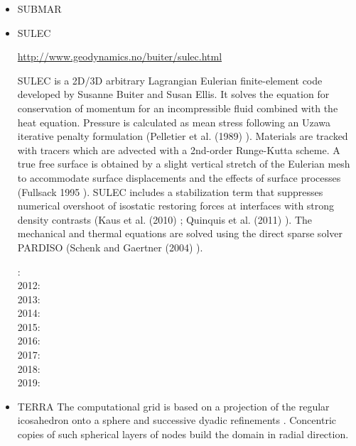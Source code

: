 \begin{itemize}
\item {\codefont SUBMAR} 

{\small
\noindent
\cite{masr06}
\cite{masp07}
\cite{roms10}
}

\item {\codefont SULEC} 

\url{http://www.geodynamics.no/buiter/sulec.html}

SULEC is a 2D/3D arbitrary Lagrangian Eulerian finite-element code developed by Susanne Buiter and Susan Ellis. 
It solves the equation for conservation of momentum for an incompressible fluid combined with 
the heat equation. Pressure is calculated as mean stress following an Uzawa iterative penalty 
formulation (Pelletier et al. (1989) \cite{pefc89}). 
Materials are tracked with tracers which are advected with a 2nd-order Runge-Kutta scheme. 
A true free surface is obtained by a slight vertical stretch of the Eulerian mesh to 
accommodate surface displacements and the effects of surface processes (Fullsack 1995 \cite{full95}). 
SULEC includes a stabilization term that suppresses numerical overshoot of isostatic restoring forces 
at interfaces with strong density contrasts (Kaus et al. (2010) \cite{kamm10}; 
Quinquis et al. (2011) \cite{qube11}). The mechanical and thermal equations are solved using 
the direct sparse solver PARDISO (Schenk and Gaertner (2004) \cite{scga04}).

{\small
{}: \cite{qube11}\cite{ellw11}\\
2012: \cite{buit12}\cite{tebu12}\cite{crsg12}\cite{grel12}\\
2013: \cite{ghbu13}\\
2014: \cite{ghbu14}\cite{qubu14}\\
2015: \cite{nabu15}\\
2016: \cite{zwsn16}\\
2017: \cite{nabp17}\\
2018: \cite{tebu18}\\
2019: \cite{elgb19}
}

\item {\codefont TERRA} 
The computational grid is based on a projection of the regular icosahedron onto a 
sphere and successive dyadic refinements \cite{bafr85}.  Concentric copies of such  
spherical layers of nodes build the domain in radial direction.


\end{itemize}
